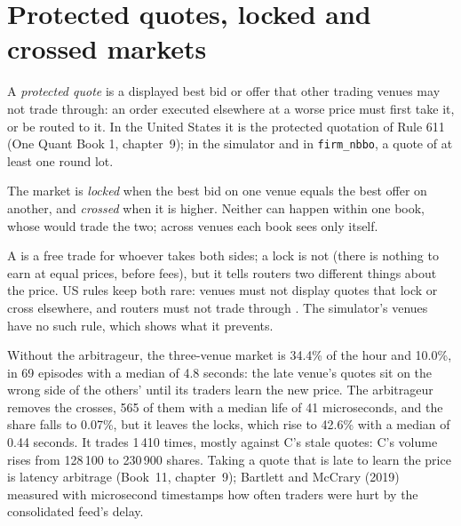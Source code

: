 \section{Protected quotes, locked and crossed markets}

\begin{definition}\label{def:mx:fragmentation-and-routing:protected}
A \emph{protected quote} is a displayed best bid or offer that other trading venues may not trade through: an order executed
elsewhere at a worse price must first take it, or be routed to it. In the United States it is the protected quotation of Rule 611 (One Quant Book 1,
chapter~9); in the simulator and in \texttt{firm\_nbbo}, a quote of at least one round lot.
\end{definition}

\begin{definition}\label{def:mx:fragmentation-and-routing:locked}
The market is \emph{locked} when the best bid on one venue equals the best offer on another, and \emph{crossed} when it is higher. Neither can happen within one book, whose  would trade the two; across venues each book sees only itself.
\end{definition}

A  is a free trade for whoever takes both sides; a lock is not (there is nothing to earn at equal prices, before fees), but it tells
routers two different things about the price. US rules keep both rare: venues must not display quotes that lock or cross  elsewhere, and
routers must not trade through . The simulator's venues have no such rule, which shows what it prevents.

\label{lst:mx:fragmentation-and-routing:arb}

Without the arbitrageur, the
three-venue market is  34.4\% of the hour and  10.0\%, in 69 episodes with a median of 4.8 seconds: the late venue's quotes sit on the wrong
side of the others' until its traders learn the new price. The arbitrageur removes the crosses, 565 of them with a median life of 41 microseconds, and
the  share falls to 0.07\%, but it leaves the locks, which rise to 42.6\% with a median of 0.44 seconds. It trades 1\,410 times, mostly against
C's stale quotes: C's volume rises from 128\,100 to 230\,900 shares. Taking a quote that is late to learn the price is latency arbitrage (Book~11,
chapter~9); Bartlett and McCrary (2019) measured with microsecond timestamps how often traders were hurt by the consolidated feed's delay.

